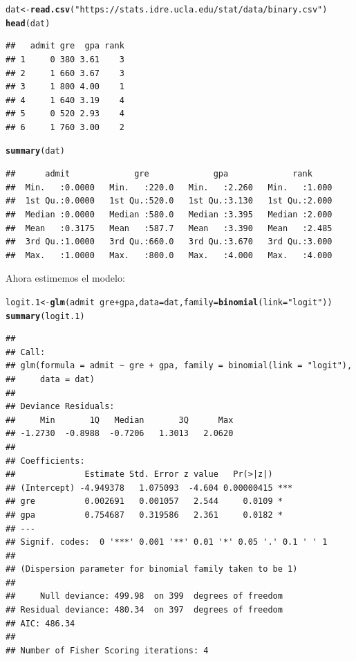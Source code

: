 \documentclass[onesided]{article}\usepackage[]{graphicx}\usepackage[]{color}
\makeatletter
\newcommand{\hlstr}[1]{\textcolor[rgb]{0.192,0.494,0.8}{#1}}%
\newcommand{\hlopt}[1]{\textcolor[rgb]{0,0,0}{#1}}%
\newcommand{\hlstd}[1]{\textcolor[rgb]{0.345,0.345,0.345}{#1}}%
\newcommand{\hlkwb}[1]{\textcolor[rgb]{0.69,0.353,0.396}{#1}}%
\newcommand{\hlkwc}[1]{\textcolor[rgb]{0.333,0.667,0.333}{#1}}%
\newcommand{\hlkwd}[1]{\textcolor[rgb]{0.737,0.353,0.396}{\textbf{#1}}}%
\newenvironment{kframe}{%
 \def\at@end@of@kframe{}%
 \ifinner\ifhmode%
  \def\at@end@of@kframe{\end{minipage}}%
  \begin{minipage}{\columnwidth}%
 \fi\fi%
 \def\FrameCommand##1{\hskip\@totalleftmargin \hskip-\fboxsep
 \colorbox{shadecolor}{##1}\hskip-\fboxsep
     \hskip-\linewidth \hskip-\@totalleftmargin \hskip\columnwidth}%
 \MakeFramed {\advance\hsize-\width
   \@totalleftmargin\z@ \linewidth\hsize
   \@setminipage}}%
 {\par\unskip\endMakeFramed%
 \at@end@of@kframe}
\newenvironment{knitrout}{}{} %
\makeatother
\begin{document}
\begin{knitrout}
\color{fgcolor}\begin{kframe}
\begin{alltt}
\hlstd{dat} \hlkwb{<-} \hlkwd{read.csv}\hlstd{(}\hlstr{"https://stats.idre.ucla.edu/stat/data/binary.csv"}\hlstd{)}
\hlkwd{head}\hlstd{(dat)}
\end{alltt}
\begin{verbatim}
##   admit gre  gpa rank
## 1     0 380 3.61    3
## 2     1 660 3.67    3
## 3     1 800 4.00    1
## 4     1 640 3.19    4
## 5     0 520 2.93    4
## 6     1 760 3.00    2
\end{verbatim}
\begin{alltt}
\hlkwd{summary}\hlstd{(dat)}
\end{alltt}
\begin{verbatim}
##      admit             gre             gpa             rank      
##  Min.   :0.0000   Min.   :220.0   Min.   :2.260   Min.   :1.000  
##  1st Qu.:0.0000   1st Qu.:520.0   1st Qu.:3.130   1st Qu.:2.000  
##  Median :0.0000   Median :580.0   Median :3.395   Median :2.000  
##  Mean   :0.3175   Mean   :587.7   Mean   :3.390   Mean   :2.485  
##  3rd Qu.:1.0000   3rd Qu.:660.0   3rd Qu.:3.670   3rd Qu.:3.000  
##  Max.   :1.0000   Max.   :800.0   Max.   :4.000   Max.   :4.000
\end{verbatim}
\end{kframe}
\end{knitrout}

Ahora estimemos el modelo:

\begin{knitrout}
\color{fgcolor}\begin{kframe}
\begin{alltt}
\hlstd{logit.1} \hlkwb{<-} \hlkwd{glm}\hlstd{(admit} \hlopt{~} \hlstd{gre} \hlopt{+} \hlstd{gpa,} \hlkwc{data} \hlstd{= dat,} \hlkwc{family} \hlstd{=} \hlkwd{binomial}\hlstd{(}\hlkwc{link} \hlstd{=} \hlstr{"logit"}\hlstd{))}
\hlkwd{summary}\hlstd{(logit.1)}
\end{alltt}
\begin{verbatim}
## 
## Call:
## glm(formula = admit ~ gre + gpa, family = binomial(link = "logit"), 
##     data = dat)
## 
## Deviance Residuals: 
##     Min       1Q   Median       3Q      Max  
## -1.2730  -0.8988  -0.7206   1.3013   2.0620  
## 
## Coefficients:
##              Estimate Std. Error z value   Pr(>|z|)    
## (Intercept) -4.949378   1.075093  -4.604 0.00000415 ***
## gre          0.002691   0.001057   2.544     0.0109 *  
## gpa          0.754687   0.319586   2.361     0.0182 *  
## ---
## Signif. codes:  0 '***' 0.001 '**' 0.01 '*' 0.05 '.' 0.1 ' ' 1
## 
## (Dispersion parameter for binomial family taken to be 1)
## 
##     Null deviance: 499.98  on 399  degrees of freedom
## Residual deviance: 480.34  on 397  degrees of freedom
## AIC: 486.34
## 
## Number of Fisher Scoring iterations: 4
\end{verbatim}
\end{kframe}
\end{knitrout}
\end{document}
